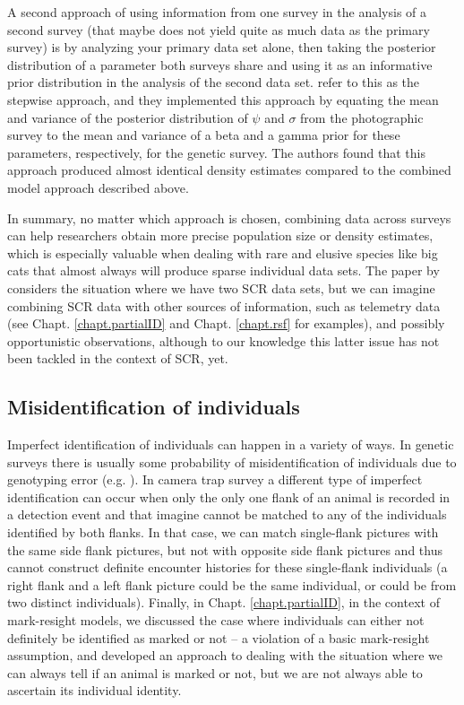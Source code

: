 A second approach of using information from one survey in the analysis
of a second survey (that maybe does not yield quite as much data as
the primary survey) is by analyzing your primary data set alone, then
taking the posterior distribution of a parameter both surveys share
and using it as an informative prior distribution in the analysis of
the second data set. \citet{gopalaswamy_etal:2012mee} refer to this as
the stepwise approach, and they implemented this approach by equating
the mean and variance of the posterior distribution of $\psi$ and
$\sigma$ from the photographic survey to the mean and variance of a
beta and a gamma prior for these parameters, respectively, for the
genetic survey. The authors found that this approach produced almost
identical density estimates compared to the combined model approach
described above.

In summary, no matter which approach is chosen, combining data across
surveys can help researchers %
obtain more precise population size or
density
estimates, which is especially valuable when dealing with rare and
elusive species like big cats that almost always will produce sparse
individual data sets.
The paper by \citet{gopalaswamy_etal:2012mee} considers the
situation where we have two SCR data sets, but we can imagine
combining SCR data with other sources of information, such as
telemetry data (see Chapt. \ref{chapt.partialID} and
Chapt. \ref{chapt.rsf} for examples), and possibly opportunistic
observations, although to our knowledge this latter issue has not been
tackled in the context of SCR, yet.


\subsection{Misidentification of individuals}

Imperfect identification of individuals can happen in a variety of
ways. In genetic surveys there is usually some probability of
misidentification of individuals due to genotyping error
(e.g. \citet{lukacs_burnham:2005}). In camera trap survey a different
type of imperfect identification can occur when only the only one
flank of an animal is recorded in a detection event and that imagine
cannot be matched to any of the individuals identified by both
flanks. In that case, we can match single-flank pictures with the same
side flank pictures, but not with opposite side flank pictures and
thus cannot construct definite encounter histories for these
single-flank individuals (a right flank and a left flank picture could
be the same individual, or could be from two distinct
individuals). Finally, in Chapt. \ref{chapt.partialID}, in the context
of mark-resight models, we discussed the case where individuals can
either not definitely be identified as marked or not -- a violation of
a basic mark-resight assumption, and developed an approach to dealing
with the situation where we can always tell if an animal is marked or
not, but we are not always able to ascertain its individual identity.

